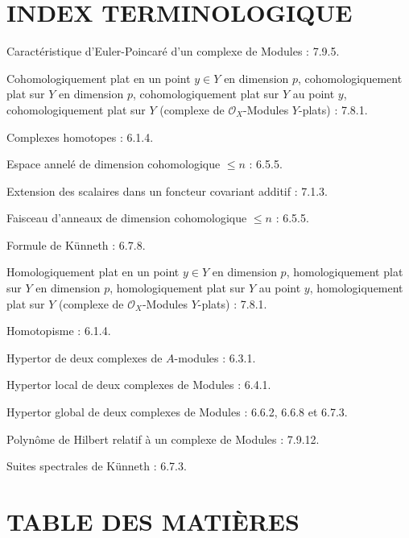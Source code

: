 \clearpage
{}
\section*{INDEX TERMINOLOGIQUE}

\begin{flushleft}
Caractéristique d'Euler-Poincaré d'un complexe de Modules : 7.9.5.

\medskip
Cohomologiquement plat en un point $y\in Y$ en dimension $p$,
cohomologiquement plat sur $Y$ en dimension $p$, cohomologiquement plat sur
$Y$ au point $y$, cohomologiquement plat sur $Y$ (complexe de
$\mathscr O_X$-Modules $Y$-plats) : 7.8.1.

\medskip
Complexes homotopes : 6.1.4.

\medskip
Espace annelé de dimension cohomologique $\leq n$ : 6.5.5.

\medskip
Extension des scalaires dans un foncteur covariant additif : 7.1.3.

\medskip
Faisceau d'anneaux de dimension cohomologique $\leq n$ : 6.5.5.

\medskip
Formule de Künneth : 6.7.8.

\medskip
Homologiquement plat en un point $y\in Y$ en dimension $p$,
homologiquement plat sur $Y$ en dimension $p$, homologiquement plat sur $Y$
au point $y$, homologiquement plat sur $Y$ (complexe de $\mathscr O_X$-Modules
$Y$-plats) : 7.8.1.

\medskip
Homotopisme : 6.1.4.

\medskip
Hypertor de deux complexes de $A$-modules : 6.3.1.

\medskip
Hypertor local de deux complexes de Modules : 6.4.1.

\medskip
Hypertor global de deux complexes de Modules : 6.6.2, 6.6.8 et 6.7.3.

\medskip
Polynôme de Hilbert relatif à un complexe de Modules : 7.9.12.

\medskip
Suites spectrales de Künneth : 6.7.3.
\end{flushleft}

\clearpage
{}
\section*{TABLE DES MATIÈRES}

